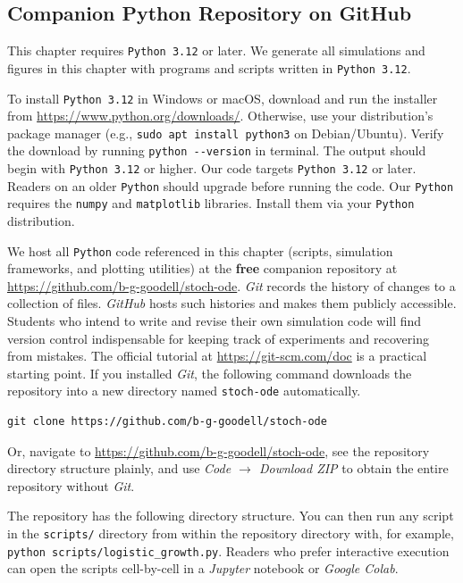 \subsection{Companion Python Repository on GitHub}\label{subsec:companion_repo}

 This chapter requires \texttt{Python 3.12} or later. We generate all simulations and figures in this chapter with programs and scripts written in \texttt{Python 3.12}.

To install \texttt{Python 3.12} in Windows or macOS, download and run the installer from \url{https://www.python.org/downloads/}. Otherwise, use your distribution's package manager (e.g., \texttt{sudo apt install python3} on Debian/Ubuntu). Verify the download by running \verb|python --version| in terminal. The output should begin with \texttt{Python 3.12} or higher. Our code targets \texttt{Python 3.12} or later. Readers on an older \texttt{Python} should upgrade before running the code. Our \texttt{Python} requires the \texttt{numpy} and \texttt{matplotlib} libraries. Install them via your \texttt{Python} distribution.

We host all \texttt{Python} code referenced in this chapter (scripts, simulation frameworks, and plotting utilities) at the \textbf{free} companion repository at \url{https://github.com/b-g-goodell/stoch-ode}.
\textit{Git} records the history of changes to a collection of
files. \textit{GitHub} hosts such histories and makes them publicly accessible. Students who intend to write and revise their own simulation code will find version control indispensable for keeping track of experiments and recovering from mistakes. The official tutorial at \url{https://git-scm.com/doc} is a
practical starting point. If you installed \textit{Git}, the following command downloads the repository into a new directory named \texttt{stoch-ode} automatically.
\begin{verbatim}
git clone https://github.com/b-g-goodell/stoch-ode
\end{verbatim}

Or, navigate to \url{https://github.com/b-g-goodell/stoch-ode}, see the repository directory structure plainly, and use \textit{Code $\to$ Download ZIP} to obtain the entire repository without \textit{Git}.

The repository has the following directory structure. You can then run any script in the \texttt{scripts/} directory from within the repository directory with, for example,
\texttt{python scripts/logistic\_growth.py}. Readers who prefer interactive execution can open the scripts cell-by-cell in a \textit{Jupyter} notebook or \textit{Google Colab}.

